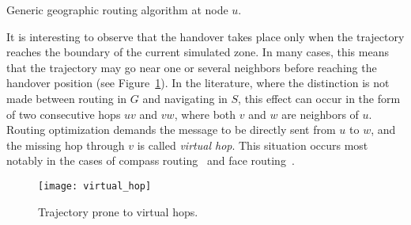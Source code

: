 \documentclass{article}
\begin{document}
\begin{table}[htb]
\begin{center}
\end{center}
\caption{Generic geographic routing algorithm at node $u$.}
\label{tab_routing}
\end{table}

It is interesting to observe that the handover takes place only when the trajectory reaches the boundary of the current simulated zone. In many cases, this means that the trajectory may go near one or several neighbors before reaching the handover position (see Figure~\ref{fig_virtual_hop}). In the literature, where the distinction is not made between routing in $G$ and navigating in $S$, this effect can occur in the form of two consecutive hops $uv$ and $vw$, where both $v$ and $w$ are neighbors of $u$. Routing optimization demands the message to be directly sent from $u$ to $w$, and the missing hop through $v$ is called {\em virtual hop}. This situation occurs most notably in the cases of compass routing~\cite{bib_compass} and face routing~\cite{bib_face}.

\begin{figure}[htb]
\begin{center}
\texttt{[image: virtual\_hop]}
\caption{Trajectory prone to virtual hops.}
\label{fig_virtual_hop}
\end{center}
\end{figure}
\end{document}
